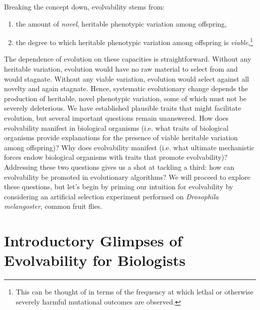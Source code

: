 Breaking the concept down, evolvability stems from:
\begin{enumerate}
\item the amount of \textit{novel}, heritable phenotypic variation among offspring,
\item the degree to which heritable phenotypic variation among offspring is \textit{viable},\footnote
{This can be thought of in terms of the frequency at which lethal or otherwise severely harmful mutational outcomes are observed.}
\end{enumerate}
The dependence of evolution on these capacities is straightforward.
Without any heritable variation, evolution would have no raw material to select from and would stagnate.
Without any viable variation, evolution would select against all novelty and again stagnate.
Hence, systematic evolutionary change depends the production of heritable, novel phenotypic variation, some of which must not be severely deleterious.
We have established plausible traits that might facilitate evolution, but several important questions remain unanswered.
How does evolvability manifest in biological organisms (i.e. what traits of biological organisms provide explanations for the presence of viable heritable variation among offspring)?
Why does evolvability manifest (i.e. what ultimate mechanistic forces endow biological organisms with traits that promote evolvability)?
Addressing these two questions gives us a shot at tackling a third: how can evolvability be promoted in evolutionary algorithms?
We will proceed to explore these questions, but let's begin by priming our intuition for evolvability by considering an artificial selection experiment performed on \textit{Drosophila melangoster}, common fruit flies.

\section{Introductory Glimpses of Evolvability for Biologists}

